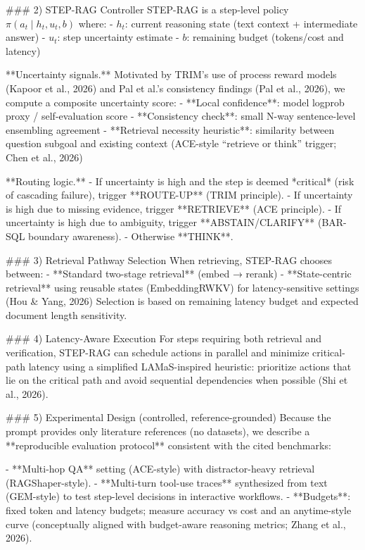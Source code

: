 ### 2) STEP-RAG Controller  
STEP-RAG is a step-level policy \(\pi(a_t \mid h_t, u_t, b)\) where:
- \(h_t\): current reasoning state (text context + intermediate answer)  
- \(u_t\): step uncertainty estimate  
- \(b\): remaining budget (tokens/cost and latency)

**Uncertainty signals.** Motivated by TRIM’s use of process reward models (Kapoor et al., 2026) and Pal et al.’s consistency findings (Pal et al., 2026), we compute a composite uncertainty score:
- **Local confidence**: model logprob proxy / self-evaluation score  
- **Consistency check**: small N-way sentence-level ensembling agreement  
- **Retrieval necessity heuristic**: similarity between question subgoal and existing context (ACE-style “retrieve or think” trigger; Chen et al., 2026)

**Routing logic.**  
- If uncertainty is high and the step is deemed *critical* (risk of cascading failure), trigger **ROUTE-UP** (TRIM principle).  
- If uncertainty is high due to missing evidence, trigger **RETRIEVE** (ACE principle).  
- If uncertainty is high due to ambiguity, trigger **ABSTAIN/CLARIFY** (BAR-SQL boundary awareness).  
- Otherwise **THINK**.

### 3) Retrieval Pathway Selection  
When retrieving, STEP-RAG chooses between:
- **Standard two-stage retrieval** (embed → rerank)  
- **State-centric retrieval** using reusable states (EmbeddingRWKV) for latency-sensitive settings (Hou & Yang, 2026)  
Selection is based on remaining latency budget and expected document length sensitivity.

### 4) Latency-Aware Execution  
For steps requiring both retrieval and verification, STEP-RAG can schedule actions in parallel and minimize critical-path latency using a simplified LAMaS-inspired heuristic: prioritize actions that lie on the critical path and avoid sequential dependencies when possible (Shi et al., 2026).

### 5) Experimental Design (controlled, reference-grounded)  
Because the prompt provides only literature references (no datasets), we describe a **reproducible evaluation protocol** consistent with the cited benchmarks:

- **Multi-hop QA** setting (ACE-style) with distractor-heavy retrieval (RAGShaper-style).  
- **Multi-turn tool-use traces** synthesized from text (GEM-style) to test step-level decisions in interactive workflows.  
- **Budgets**: fixed token and latency budgets; measure accuracy vs cost and an anytime-style curve (conceptually aligned with budget-aware reasoning metrics; Zhang et al., 2026).

